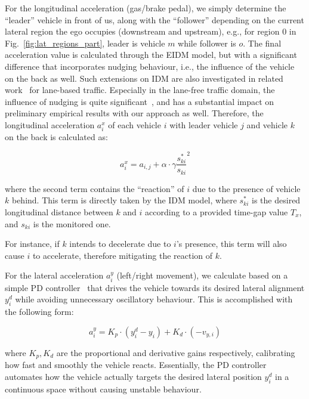 For the longitudinal acceleration (gas/brake pedal), we simply determine the ``leader'' vehicle in front of us, along with the ``follower'' depending on the current lateral region the ego occupies (downstream and upstream), e.g., for region $0$ in Fig.~\ref{fig:lat_regions_part}, leader is vehicle $m$ while follower is $o$.
The final acceleration value is calculated through the EIDM model, but with a significant difference that incorporates nudging behaviour, i.e., the influence of the vehicle on the back as well.
Such extensions on IDM are also investigated in related work~\citep{YI2022127606} for lane-based traffic.
Especially in the lane-free traffic domain, the influence of nudging is quite significant~\citep{lane_free_journal}, and has a substantial impact on preliminary empirical results with our approach as well.
Therefore, the longitudinal acceleration $a^x_i$ of each vehicle $i$ with leader vehicle $j$ and vehicle $k$ on the back is calculated as:

\begin{equation}
    a^x_i = a_{i,j}+ \alpha \cdot \gamma \frac{s^*_{ki}}{s_{ki}}^2 
\end{equation}

\noindent where the second term contains the ``reaction'' of $i$ due to the presence of vehicle $k$ behind.
This term is directly taken by the IDM model, where $s^*_{ki}$ is the desired longitudinal distance between $k$ and $i$ according to a provided time-gap value $T_x$, and $s_{ki}$ is the monitored one.

For instance, if $k$ intends to decelerate due to $i$'s presence, this term will also cause $i$ to accelerate, therefore mitigating the reaction of $k$.


For the lateral acceleration $a_i^y$ (left/right movement), we calculate based on a simple PD controller~\cite{kuo1995automatic} that drives the vehicle towards its desired lateral alignment $y_i^d$ while avoiding unnecessary oscillatory behaviour. This is accomplished with the following form:

\begin{equation}\label{eq:ay_update}
    a^y_i = K_p \cdot (y_i^d - y_i) + K_d \cdot (-v_{y,i})
\end{equation}

\noindent where $K_p,K_d$ are the proportional and derivative gains respectively, calibrating how fast and smoothly the vehicle reacts.
Essentially, the PD controller automates how the vehicle actually targets the desired lateral position $y_i^d$ in a continuous space without causing unstable behaviour.




